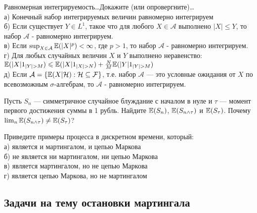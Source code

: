 \begin{problem}
 Равномерная интегрируемость\ldots Докажите (или опровергните)\ldots \\
а) Конечный набор интегрируемых величин равномерно
интегрируем \\
б) Если существует $Y\in L^{1}$, такое что для любого $X\in
\mathcal{A}$ выполнено $|X|\le Y$, то набор $\mathcal{A}$ -
равномерно интегрируем. \\
в) Если $\sup_{X\in \mathcal{A}}\mathbb{E}(|X|^{p})<\infty$, где $p>1$, то
набор $\mathcal{A}$ -
равномерно интегрируем. \\
г) Для любых случайных величин $X$ и $Y$ выполнено неравенство:
$\E(|X|1_{|Y|>M})\le \E(|X|1_{|X|>N})+\frac{N}{M}\E(|Y|1_{|Y|>M})$ \\
д) Если $\mathcal{A}=\{\mathbb{E}(X|\mathcal{H}):\mathcal{H}\subseteq
\mathcal{F}\}$, т.е. набор $\mathcal{A}$ --- это условные ожидания
от $X$ по всевозможным $\sigma$-алгебрам, то $\mathcal{A}$ -
равномерно интегрируем. 
\end{problem} 
\begin{solution} 

\end{solution}

\begin{problem}
Пусть $S_{n}$ --- симметричное случайное блуждание с началом в
нуле и $\tau$ --- момент первого достижения суммы в 1 рубль. Найдите
$\mathbb{E}(S_{n})$, $\mathbb{E}(S_{n\wedge \tau})$ и $\mathbb{E}(S_{\tau})$. Почему
$\lim_{n}
\mathbb{E}(S_{n\wedge \tau})\neq \mathbb{E}(S_{\tau})$? 
\end{problem} 
\begin{solution} 

\end{solution}

\begin{problem}
Приведите примеры процесса в дискретном времени, который: \\
а) является и мартингалом, и цепью Маркова \\
б) не является ни мартингалом, ни цепью Маркова \\
в) является мартингалом, но не цепью Маркова \\
г) является цепью Маркова, но не мартингалом 
\end{problem} 
\begin{solution} 
\end{solution}

\subsection{Задачи на тему остановки мартингала} 

